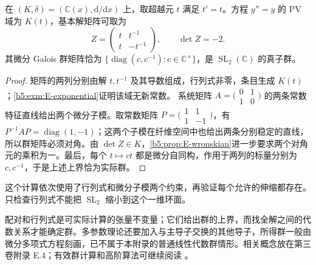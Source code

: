 \begin{proposition}\label{b5:prop:E-second-order-torus}
	在 \((K,\delta)=(\mathbb C(x),\mathrm d/\mathrm dx)\) 上，取超越元 \(t\) 满足 \(t'=t\)。方程 \(y''=y\) 的 PV 域为 \(K(t)\)，基本解矩阵可取为
	\[
		Z=\begin{pmatrix}t&t^{-1}\\t&-t^{-1}\end{pmatrix},
		\qquad \det Z=-2.
	\]
	其微分 Galois 群矩阵恰为 \(\{\operatorname{diag}(c,c^{-1}):c\in\mathbb C^\times\}\)，是 \(\operatorname{SL}_2(\mathbb C)\) 的真子群。
\end{proposition}
\begin{proof}
	矩阵的两列分别由解 \(t,t^{-1}\) 及其导数组成，行列式非零，条目生成 \(K(t)\)；\cref{b5:exm:E-exponential}证明该域无新常数。
	系统矩阵 \(A=\bigl(\begin{smallmatrix}0&1\\1&0\end{smallmatrix}\bigr)\) 的两条常数特征直线给出两个微分子模。取常数矩阵
	\(P=\bigl(\begin{smallmatrix}1&1\\1&-1\end{smallmatrix}\bigr)\)，有 \(P^{-1}AP=\operatorname{diag}(1,-1)\)；这两个子模在纤维空间中也给出两条分别稳定的直线，所以群矩阵必须对角。由 \(\det Z\in K\)，\cref{b5:prop:E-wronskian}进一步要求两个对角元的乘积为一。最后，每个 \(t\mapsto ct\) 都是微分自同构，作用于两列的标量分别为 \(c,c^{-1}\)，于是上述上界恰为实际群。
\end{proof}

这个计算依次使用了行列式和微分子模两个约束，再验证每个允许的伸缩都存在。只检查行列式不能把 \(\operatorname{SL}_2\) 缩小到这个一维环面。

\ProseParagraphBreak
配对和行列式是可实际计算的张量不变量；它们给出群的上界，而找全解之间的代数关系才能确定群。多参数理论还要加入与主导子交换的其他导子，所得群一般由微分多项式方程刻画，已不属于本附录的普通线性代数群情形。相关概念放在第三卷附录 E.4；有效群计算和高阶算法可继续阅读 \cite[Sections 1.3--1.5]{Singer2009DifferentialGalois}。
